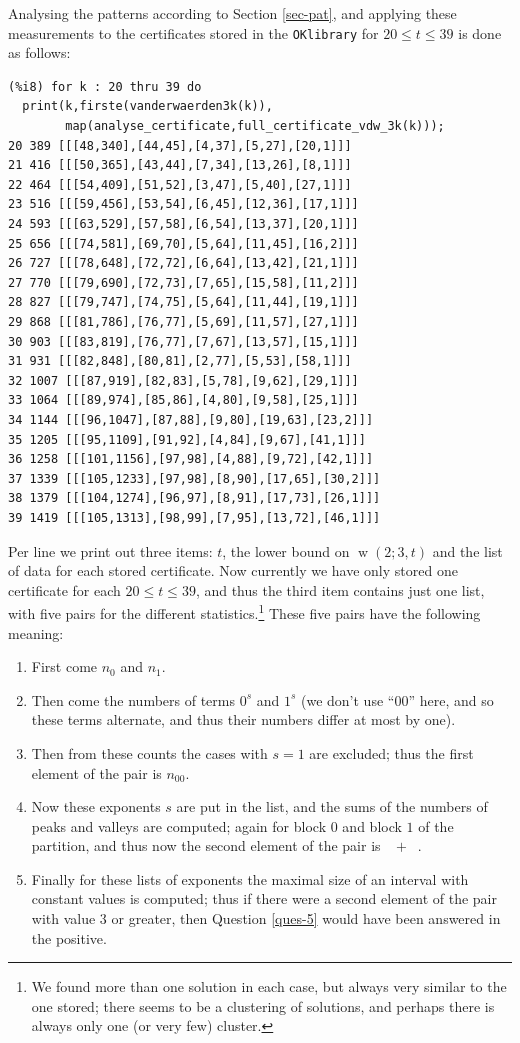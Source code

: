 \documentclass[final,3p,times]{elsarticle}
\theoremstyle{definition}
\renewcommand{\leq}{\le} %
\newcommand{\OKlibrary}{\texttt{OKlibrary}}
\DeclareMathOperator{\np}{\mathit{n}_p}
\DeclareMathOperator{\nv}{\mathit{n}_v}
\DeclareMathOperator{\vdw}{w}
\begin{document}
\begin{appendix}
Analysing the patterns according to Section \ref{sec-pat}, and applying these measurements to the certificates stored in the \OKlibrary{} for $20 \leq t \leq 39$ is done as follows:
\begin{verbatim}
(%i8) for k : 20 thru 39 do
  print(k,firste(vanderwaerden3k(k)),
        map(analyse_certificate,full_certificate_vdw_3k(k)));
20 389 [[[48,340],[44,45],[4,37],[5,27],[20,1]]]
21 416 [[[50,365],[43,44],[7,34],[13,26],[8,1]]]
22 464 [[[54,409],[51,52],[3,47],[5,40],[27,1]]]
23 516 [[[59,456],[53,54],[6,45],[12,36],[17,1]]]
24 593 [[[63,529],[57,58],[6,54],[13,37],[20,1]]]
25 656 [[[74,581],[69,70],[5,64],[11,45],[16,2]]]
26 727 [[[78,648],[72,72],[6,64],[13,42],[21,1]]]
27 770 [[[79,690],[72,73],[7,65],[15,58],[11,2]]]
28 827 [[[79,747],[74,75],[5,64],[11,44],[19,1]]]
29 868 [[[81,786],[76,77],[5,69],[11,57],[27,1]]]
30 903 [[[83,819],[76,77],[7,67],[13,57],[15,1]]]
31 931 [[[82,848],[80,81],[2,77],[5,53],[58,1]]]
32 1007 [[[87,919],[82,83],[5,78],[9,62],[29,1]]]
33 1064 [[[89,974],[85,86],[4,80],[9,58],[25,1]]]
34 1144 [[[96,1047],[87,88],[9,80],[19,63],[23,2]]]
35 1205 [[[95,1109],[91,92],[4,84],[9,67],[41,1]]]
36 1258 [[[101,1156],[97,98],[4,88],[9,72],[42,1]]]
37 1339 [[[105,1233],[97,98],[8,90],[17,65],[30,2]]]
38 1379 [[[104,1274],[96,97],[8,91],[17,73],[26,1]]]
39 1419 [[[105,1313],[98,99],[7,95],[13,72],[46,1]]]
\end{verbatim}
Per line we print out three items: $t$, the lower bound on $\vdw(2;3,t)$ and the list of data for each stored certificate. Now currently we have only stored one certificate for each $20 \leq t \leq 39$, and thus the third item contains just one list, with five pairs for the different statistics.\footnote{We found more than one solution in each case, but always very similar to the one stored; there seems to be a clustering of solutions, and perhaps there is always only one (or very few) cluster.} These five pairs have the following meaning:
\begin{enumerate}
\item First come $n_0$ and $n_1$.
\item Then come the numbers of terms $0^s$ and $1^s$ (we don't use ``$00$'' here, and so these terms alternate, and thus their numbers differ at most by one).
\item Then from these counts the cases with $s=1$ are excluded; thus the first element of the pair is $n_{00}$.
\item Now these exponents $s$ are put in the list, and the sums of the numbers of peaks and valleys are computed; again for block $0$ and block $1$ of the partition, and thus now the second element of the pair is $\np + \nv$.
\item Finally for these lists of exponents the maximal size of an interval with constant values is computed; thus if there were a second element of the pair with value $3$ or greater, then Question \ref{ques-5} would have been answered in the positive.
\end{enumerate}


\end{appendix}
\end{document}
